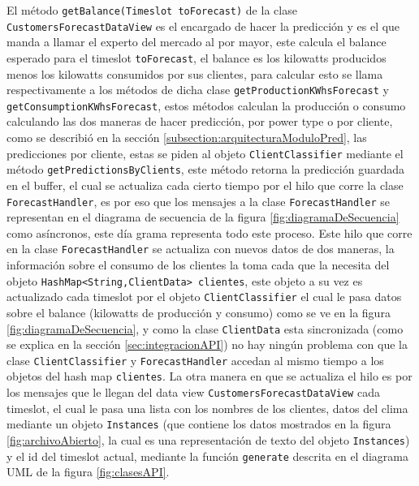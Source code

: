 El método \texttt{getBalance(Timeslot toForecast)} de la clase \texttt{CustomersForecastDataView} es el encargado de hacer la predicción y es el que manda a llamar el experto del mercado al por mayor, este calcula el balance esperado para el timeslot \texttt{toForecast}, el balance es los kilowatts producidos menos los kilowatts consumidos por sus clientes, para calcular esto se llama respectivamente a los métodos de dicha clase \texttt{getProductionKWhsForecast} y \\ \texttt{getConsumptionKWhsForecast}, estos métodos calculan la producción o consumo calculando las dos maneras de hacer predicción, por power type o por cliente, como se describió en la sección \ref{subsection:arquitecturaModuloPred}, las predicciones por cliente, estas se piden al objeto \texttt{ClientClassifier} mediante el método \texttt{getPredictionsByClients}, este método retorna la predicción guardada en el buffer, el cual se actualiza cada cierto tiempo por el hilo que corre la clase \texttt{ForecastHandler}, es por eso que los mensajes a la clase \texttt{ForecastHandler} se representan en el diagrama de secuencia de la figura \ref{fig:diagramaDeSecuencia} como asíncronos, este día grama representa todo este proceso.
Este hilo que corre en la clase \texttt{ForecastHandler} se actualiza con nuevos datos de dos maneras, la información sobre el consumo de los clientes la toma cada que la necesita del objeto \texttt{HashMap<String,ClientData> clientes}, este objeto a su vez es actualizado cada timeslot por el objeto \texttt{ClientClassifier} el cual le pasa datos sobre el balance (kilowatts de producción y consumo) como se ve en la figura \ref{fig:diagramaDeSecuencia}, 
 y como la clase \texttt{ClientData} esta sincronizada (como se explica en la sección \ref{sec:integracionAPI}) no hay ningún problema con que la clase \texttt{ClientClassifier} y \texttt{ForecastHandler} accedan al mismo tiempo a los objetos del hash map \texttt{clientes}.
La otra manera en que se actualiza el hilo es por los mensajes que le llegan del data view \texttt{CustomersForecastDataView} cada timeslot, el cual le pasa una lista con los nombres de los clientes, datos del clima mediante un objeto \texttt{Instances} (que contiene los datos mostrados en la figura \ref{fig:archivoAbierto}, la cual es una representación de texto del objeto \texttt{Instances}) y el id del timeslot actual, mediante la función \texttt{generate} descrita en el diagrama UML de la figura \ref{fig:clasesAPI}.

